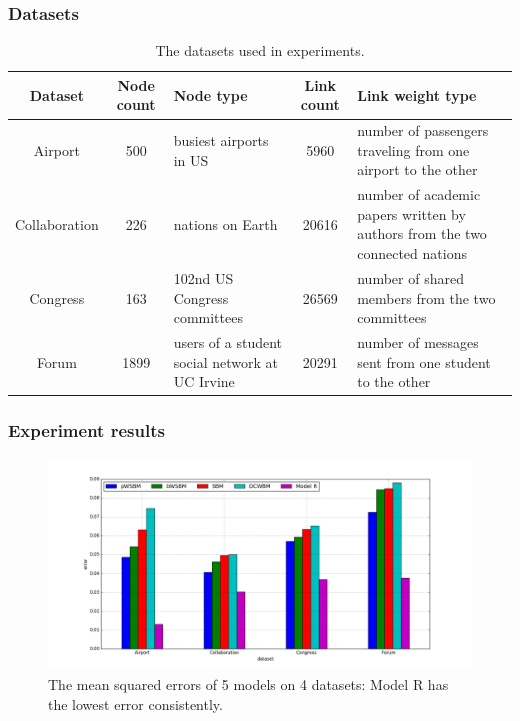\documentclass{article}
\begin{document}
\begin{landscape}
\subsubsection{Datasets}
\begin{table}[H]\centering
	\caption{The datasets used in experiments.}
	\begin{tabularx}{\textwidth}{|c|c|X|c|X|}  \hline
		Dataset & Node count & Node type & Link count & Link weight type \\ \hline
		Airport & 500 & busiest airports in US & 5960 & number of passengers traveling from one airport to the other\\ \hline
		Collaboration & 226 & nations on Earth & 20616 & number of academic papers written by authors from the two connected nations \\ \hline
		Congress & 163  & 102nd US Congress committees & 26569 & number of shared members from the two committees \\ \hline
		Forum  & 1899 & users of a student social network at UC Irvine & 20291 & number of messages sent from one student to the other \\ \hline
	\end{tabularx}
	\label{tab:datasets}
\end{table}

\subsubsection{Experiment results}

\begin{figure}[H]\centering
	\includegraphics[width=\textwidth]{link-weight-errors}
	\caption{
		The mean squared errors of 5 models on 4 datasets:
		Model R has the lowest error consistently.
	}
	\label{fig:errors}
\end{figure}

\pagebreak

\end{landscape}
\end{document}
